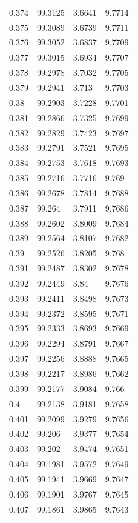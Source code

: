 \begin{tabular}{llll}
0.374 & 99.3125 & 3.6641 & 9.7714 \\
0.375 & 99.3089 & 3.6739 & 9.7711 \\
0.376 & 99.3052 & 3.6837 & 9.7709 \\
0.377 & 99.3015 & 3.6934 & 9.7707 \\
0.378 & 99.2978 & 3.7032 & 9.7705 \\
0.379 & 99.2941 & 3.713 & 9.7703 \\
0.38 & 99.2903 & 3.7228 & 9.7701 \\
0.381 & 99.2866 & 3.7325 & 9.7699 \\
0.382 & 99.2829 & 3.7423 & 9.7697 \\
0.383 & 99.2791 & 3.7521 & 9.7695 \\
0.384 & 99.2753 & 3.7618 & 9.7693 \\
0.385 & 99.2716 & 3.7716 & 9.769 \\
0.386 & 99.2678 & 3.7814 & 9.7688 \\
0.387 & 99.264 & 3.7911 & 9.7686 \\
0.388 & 99.2602 & 3.8009 & 9.7684 \\
0.389 & 99.2564 & 3.8107 & 9.7682 \\
0.39 & 99.2526 & 3.8205 & 9.768 \\
0.391 & 99.2487 & 3.8302 & 9.7678 \\
0.392 & 99.2449 & 3.84 & 9.7676 \\
0.393 & 99.2411 & 3.8498 & 9.7673 \\
0.394 & 99.2372 & 3.8595 & 9.7671 \\
0.395 & 99.2333 & 3.8693 & 9.7669 \\
0.396 & 99.2294 & 3.8791 & 9.7667 \\
0.397 & 99.2256 & 3.8888 & 9.7665 \\
0.398 & 99.2217 & 3.8986 & 9.7662 \\
0.399 & 99.2177 & 3.9084 & 9.766 \\
0.4 & 99.2138 & 3.9181 & 9.7658 \\
0.401 & 99.2099 & 3.9279 & 9.7656 \\
0.402 & 99.206 & 3.9377 & 9.7654 \\
0.403 & 99.202 & 3.9474 & 9.7651 \\
0.404 & 99.1981 & 3.9572 & 9.7649 \\
0.405 & 99.1941 & 3.9669 & 9.7647 \\
0.406 & 99.1901 & 3.9767 & 9.7645 \\
0.407 & 99.1861 & 3.9865 & 9.7643 \\

\end{tabular}
